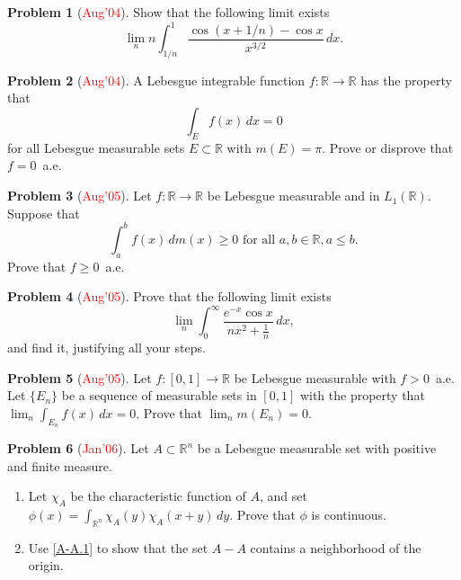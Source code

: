 \documentclass[12pt,reqno]{amsart}
\def\field#1{\mathbb{#1}}
\def\redc#1{[\textcolor{red}{#1}]}
\theoremstyle{definition}
\newtheorem{problem}{Problem}
\theoremstyle{remark}
\begin{document}
\begin{problem}\redc{Aug'04}
  Show that the following limit exists
  \begin{equation*}
    \lim_n n\int_{1/n}^1 \frac{\cos (x+1/n) - \cos x}{x^{3/2}}\, dx.
  \end{equation*}
\end{problem}
\begin{problem}\redc{Aug'04}
  A Lebesgue integrable function $f \colon \field{R} \to \field{R}$
  has the property that
  \begin{equation*}
    \int_E f(x)\, dx = 0
  \end{equation*}
  for all Lebesgue measurable sets $E \subset \field{R}$ with $m(E) =
  \pi$.  Prove or disprove that $f = 0$~a.e.
\end{problem}
\begin{problem}\redc{Aug'05}
  Let $f \colon \field{R} \to \field{R}$ be Lebesgue measurable and in
  $L_1(\field{R})$. Suppose that
  \begin{equation*}
    \int_a^b f(x)\, dm(x) \geq 0 \text{ for all } a,b \in \field{R},
    a\leq b.
  \end{equation*}
  Prove that $f \geq 0$~a.e.
\end{problem}
\begin{problem}\redc{Aug'05}
  Prove that the following limit exists
  \begin{equation*}
    \lim_n \int_0^\infty \frac{e^{-x} \cos x}{nx^2+\tfrac{1}{n}}\, dx,
  \end{equation*}
  and find it, justifying all your steps.
\end{problem}
\begin{problem}\redc{Aug'05}
  Let $f\colon [0,1] \to \field{R}$ be Lebesgue measurable with $f >
  0$~a.e. Let $\{ E_n \}$ be a sequence of measurable sets in $[0,1]$
  with the property that $\lim_n \int_{E_n} f(x)\, dx = 0$.  Prove
  that $\lim_n m(E_n) = 0$.
\end{problem}
\begin{problem}\redc{Jan'06} \label{A-A}
  Let $A \subset \field{R}^n$ be a Lebesgue measurable set with
  positive and finite measure.  
  \begin{enumerate}
  \item\label{A-A.1} Let $\chi_A$ be the characteristic function of
    $A$, and set $\phi(x) = \int_{\field{R}^n} \chi_A(y) \chi_A(x+y)\,
    dy$. Prove that $\phi$ is continuous.
  \item Use \ref{A-A.1} to show that the set $A-A$ contains a
    neighborhood of the origin.
  \end{enumerate}
\end{problem}
\end{document}
